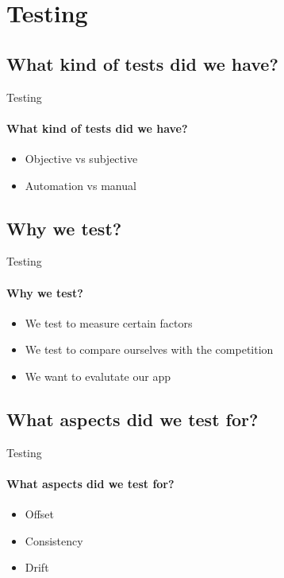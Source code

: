 \author{Troels}
\section{Testing}
    \subsection{What kind of tests did we have?}
        \begin{frame}{Testing}\framesubtitle{What kind of tests did we have?}
            \begin{itemize}
                \item Objective vs subjective
                \item Automation vs manual
            \end{itemize}
        \end{frame}
    \subsection{Why we test?}
        \begin{frame}{Testing}\framesubtitle{Why we test?}
            \begin{itemize}
                \item We test to measure certain factors
                \item We test to compare ourselves with the competition
                \item We want to evalutate our app
            \end{itemize}
        \end{frame}
    \subsection{What aspects did we test for?}
        \begin{frame}{Testing}\framesubtitle{What aspects did we test for?}
            \begin{itemize}
                \item Offset
                \item Consistency
                \item Drift
            \end{itemize}
        \end{frame}
